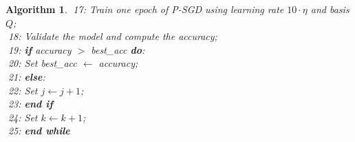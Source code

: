 \documentclass[11pt, a4paper]{article}
\newtheorem{algorithm}[theorem]{Algorithm}
\begin{document}
\begin{algorithm}
\textcolor{white}{$\Big |$}17: \quad Train one epoch of P-SGD using learning rate $10\cdot\eta$ and basis $Q$; \\
\textcolor{white}{$\Big |$}18: \quad Validate the model and compute the accuracy; \\
\textcolor{white}{$\Big |$}19: \quad \textbf{if} accuracy $>$ best\_acc \textbf{do}: \\
\textcolor{white}{$\Big |$}20: \quad \quad Set best\_acc $\leftarrow$ accuracy; \\
\textcolor{white}{$\Big |$}21: \quad \textbf{else}: \\
\textcolor{white}{$\Big |$}22: \quad \quad Set $j \leftarrow j +1$; \\
\textcolor{white}{$\Big |$}23: \quad \textbf{end if} \\
\textcolor{white}{$\Big |$}24: \quad Set $k \leftarrow k+1$; \\
\textcolor{white}{$\Big |$}25: \textbf{end while} \\
\end{algorithm}
\end{document}
